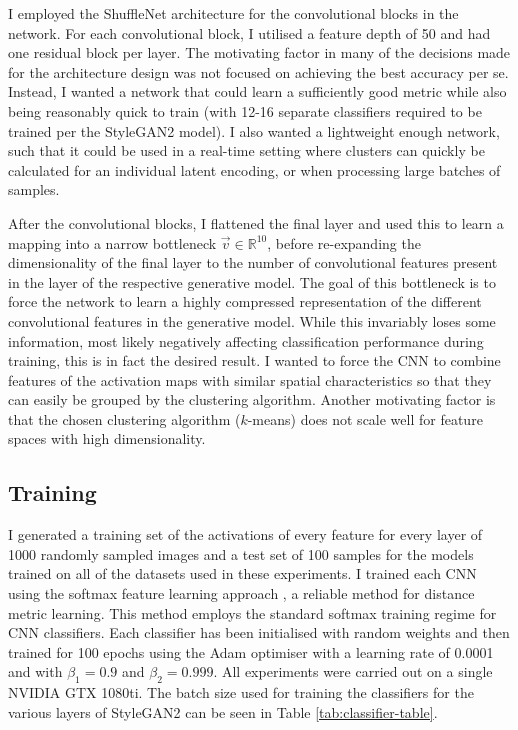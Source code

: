 I employed the ShuffleNet architecture \citep{zhang2018shufflenet} for the convolutional blocks in the network. 
For each convolutional block, I utilised a feature depth of 50 and had one residual block per layer. 
The motivating factor in many of the decisions made for the architecture design was not focused on achieving the best accuracy per se. 
Instead, I wanted a network that could learn a sufficiently good metric while also being reasonably quick to train (with 12-16 separate classifiers required to be trained per the StyleGAN2 model). 
I also wanted a lightweight enough network, such that it could be used in a real-time setting where clusters can quickly be calculated for an individual latent encoding, or when processing large batches of samples.

After the convolutional blocks, I flattened the final layer and used this to learn a mapping into a narrow bottleneck $\vec{v} \in \mathbb{R}^{10}$, before re-expanding the dimensionality of the final layer to the number of convolutional features present in the layer of the respective generative model. 
The goal of this bottleneck is to force the network to learn a highly compressed representation of the different convolutional features in the generative model. 
While this invariably loses some information, most likely negatively affecting classification performance during training, this is in fact the desired result. 
I wanted to force the CNN to combine features of the activation maps with similar spatial characteristics so that they can easily be grouped by the clustering algorithm. 
Another motivating factor is that the chosen clustering algorithm ($k$-means) does not scale well for feature spaces with high dimensionality.

\subsection{Training}

I generated a training set of the activations of every feature for every layer of 1000 randomly sampled images and a test set of 100 samples for the models trained on all of the datasets used in these experiments. 
I trained each CNN using the softmax feature learning approach \citep{dosovitskiy2014discriminative}, a reliable method for distance metric learning. This method employs the standard softmax training regime \citep{bridle1990probabilistic} for CNN classifiers. 
Each classifier has been initialised with random weights and then trained for 100 epochs using the Adam optimiser \citep{kingma2015adam} with a learning rate of 0.0001 and with $\beta_1 = 0.9$ and $\beta_2 = 0.999$. 
All experiments were carried out on a single NVIDIA GTX 1080ti. The batch size used for training the classifiers for the various layers of StyleGAN2 can be seen in Table \ref{tab:classifier-table}. 

